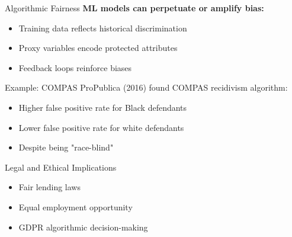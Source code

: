 \documentclass[aspectratio=169]{beamer}
\begin{document}
\begin{frame}{Algorithmic Fairness}
  \textbf{ML models can perpetuate or amplify bias:}

  \begin{itemize}
    \item Training data reflects historical discrimination
    \item Proxy variables encode protected attributes
    \item Feedback loops reinforce biases
  \end{itemize}

  \vspace{0.5em}

  \begin{examplebox}{Example: COMPAS}
    ProPublica (2016) found COMPAS recidivism algorithm:
    \begin{itemize}
      \item Higher false positive rate for Black defendants
      \item Lower false positive rate for white defendants
      \item Despite being "race-blind"
    \end{itemize}
  \end{examplebox}

  \vspace{0.5em}

  \begin{alertbox}{Legal and Ethical Implications}
    \begin{itemize}
      \item Fair lending laws
      \item Equal employment opportunity
      \item GDPR algorithmic decision-making
    \end{itemize}
  \end{alertbox}
\end{frame}
\end{document}
